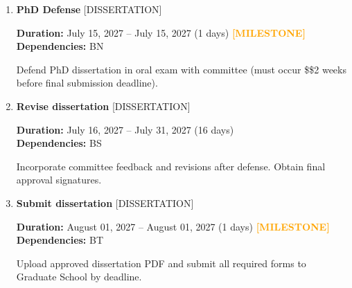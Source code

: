 \documentclass[landscape,a4paper]{article}
\begin{document}
\begin{enumerate}[leftmargin=1.5cm, itemsep=1em, parsep=0.5em]
    \item \textcolor{other}{\textbf{\large PhD Defense}}
          \hfill \textcolor{black!60}{\small [DISSERTATION]}
          
          \vspace{0.2em}
          \textcolor{black!70}{\textbf{Duration:} July 15, 2027 -- July 15, 2027 (1 days)}
          \textcolor{orange}{\textbf{ [MILESTONE]}}\n          \\[0.2em]\textcolor{black!70}{\textbf{Dependencies:} BN}\n
          \vspace{0.4em}
          \begin{minipage}[t]{0.9\textwidth}
          \textcolor{black!85}{Defend PhD dissertation in oral exam with committee (must occur \$\geq\$2 weeks before final submission deadline).}
          \end{minipage}

    \item \textcolor{other}{\textbf{\large Revise dissertation}}
          \hfill \textcolor{black!60}{\small [DISSERTATION]}
          
          \vspace{0.2em}
          \textcolor{black!70}{\textbf{Duration:} July 16, 2027 -- July 31, 2027 (16 days)}
          \\[0.2em]\textcolor{black!70}{\textbf{Dependencies:} BS}\n
          \vspace{0.4em}
          \begin{minipage}[t]{0.9\textwidth}
          \textcolor{black!85}{Incorporate committee feedback and revisions after defense. Obtain final approval signatures.}
          \end{minipage}

    \item \textcolor{other}{\textbf{\large Submit dissertation}}
          \hfill \textcolor{black!60}{\small [DISSERTATION]}
          
          \vspace{0.2em}
          \textcolor{black!70}{\textbf{Duration:} August 01, 2027 -- August 01, 2027 (1 days)}
          \textcolor{orange}{\textbf{ [MILESTONE]}}\n          \\[0.2em]\textcolor{black!70}{\textbf{Dependencies:} BT}\n
          \vspace{0.4em}
          \begin{minipage}[t]{0.9\textwidth}
          \textcolor{black!85}{Upload approved dissertation PDF and submit all required forms to Graduate School by deadline.}
          \end{minipage}
\end{enumerate}
\newpage
\end{document}

